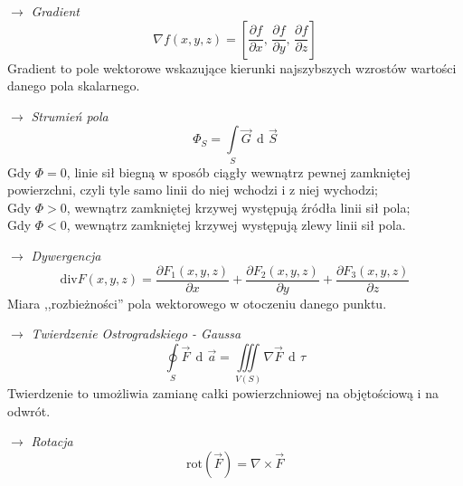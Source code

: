 \documentclass[12pt]{article}
\newenvironment{wzor}[1]{\par{\Large $\longrightarrow$ \textit{#1}}}
    {\newline {\color{grey} \rule{\linewidth}{0.3pt}}}
\DeclareMathOperator{\der}{\operatorname{d}\!}
\begin{document}

\begin{wzor}{Gradient}
    \begin{equation}
        \nabla f(x,y,z) = \left[
                \frac{\partial f}{\partial x},\,
                \frac{\partial f}{\partial y},\,
                \frac{\partial f}{\partial z}
        \right]
    \end{equation}
    Gradient to pole wektorowe wskazujące kierunki najszybszych wzrostów wartości
    danego pola skalarnego.
\end{wzor}

\begin{wzor}{Strumień pola}
    \begin{equation}
        \Phi_S = \int\limits_S \Vec{G} \, \der \Vec{S}
    \end{equation}
    Gdy $\Phi = 0$, linie sił biegną w sposób ciągły wewnątrz pewnej zamkniętej powierzchni,
    czyli tyle samo linii do niej wchodzi i z niej wychodzi;\\
    Gdy $\Phi > 0$, wewnątrz zamkniętej krzywej występują źródła linii sił pola;\\
    Gdy $\Phi < 0$, wewnątrz zamkniętej krzywej występują zlewy linii sił pola.
\end{wzor}

\begin{wzor}{Dywergencja}
    \begin{equation}
        \mathrm{div} F(x,y,z) = \frac{\partial F_1(x,y,z)}{\partial x}
                + \frac{\partial F_2(x,y,z)}{\partial y}
                + \frac{\partial F_3(x,y,z)}{\partial z}
    \end{equation}
    Miara ,,rozbieżności'' pola wektorowego w otoczeniu danego punktu.
\end{wzor}

\begin{wzor}{Twierdzenie Ostrogradskiego - Gaussa}
    \begin{equation}
        \oint\limits_S \Vec{F} \, \der \Vec{a} = \iiint\limits_{V(S)} \nabla \Vec{F} \, \der\tau
    \end{equation}
    Twierdzenie to umożliwia zamianę całki powierzchniowej na objętościową i na odwrót.
\end{wzor}

\begin{wzor}{Rotacja}
    \begin{equation}
        \mathrm{rot}(\Vec{F}) = \nabla \times \Vec{F}
    \end{equation}
\end{wzor}
\end{document}
